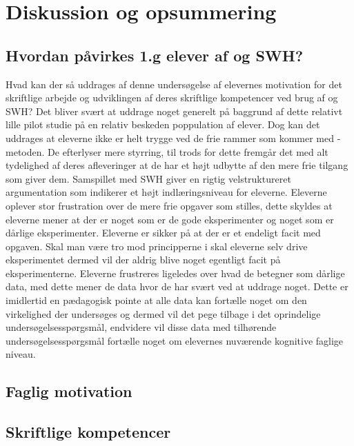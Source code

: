 \chapter{Diskussion og opsummering}
\label{Ch:5}

\section{Hvordan påvirkes 1.g elever af \ib{} og SWH?}
\label{sec:ibseswh}
Hvad kan der så uddrages af denne undersøgelse af elevernes motivation for det skriftlige arbejde og udviklingen af deres skriftlige kompetencer ved brug af \ib{} og SWH? Det bliver svært at uddrage noget generelt på baggrund af dette relativt lille pilot studie på en relativ beskeden poppulation af elever. Dog kan det uddrages at eleverne ikke er helt trygge ved de frie rammer som kommer med \ib{}-metoden. De efterlyser mere styrring, til trods for dette fremgår det med alt tydelighed af deres afleveringer at de har et højt udbytte af den mere frie tilgang som \ib{} giver dem. Samspillet med SWH giver en rigtig velstruktureret argumentation som indikerer et højt indlæringsniveau for eleverne. 
Eleverne oplever stor frustration over de mere frie opgaver som stilles, dette skyldes at eleverne mener at der er noget som er de gode eksperimenter og noget som er dårlige eksperimenter. Eleverne er sikker på at der er et endeligt facit med opgaven. Skal man være tro mod principperne i \ib{} skal eleverne selv drive eksperimentet dermed vil der aldrig blive noget egentligt facit på eksperimenterne. Eleverne frustreres ligeledes over hvad de betegner som dårlige data, med dette mener de data hvor de har svært ved at uddrage noget. Dette er imidlertid en pædagogisk pointe at alle data kan fortælle noget om den virkelighed der undersøges og dermed vil det pege tilbage i det oprindelige undersøgelsesspørgsmål, endvidere vil disse data med tilhørende undersøgelsesspørgsmål fortælle noget om elevernes nuværende kognitive faglige niveau. 

\section{Faglig motivation}
\label{sec:faglig}


\section{Skriftlige kompetencer}
\label{sec:skr}
